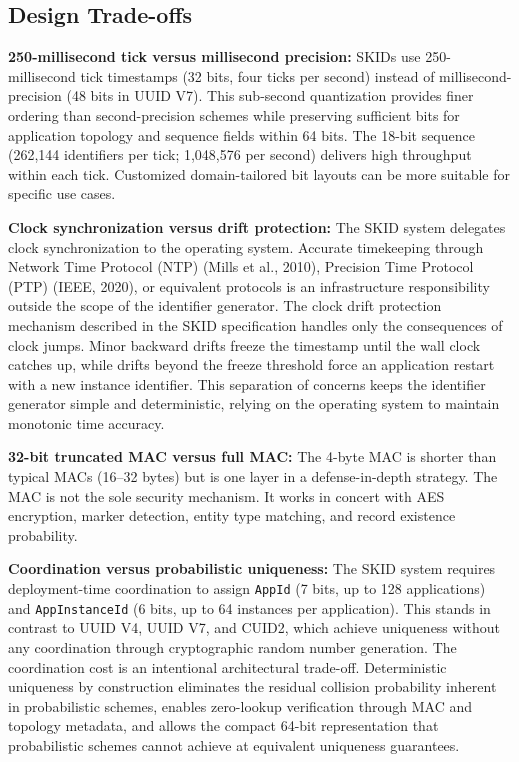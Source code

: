 \documentclass[fleqn,10pt,lineno]{wlpeerj}
\begin{document}
\subsection{Design Trade-offs}\label{design-trade-offs}

\textbf{250-millisecond tick versus millisecond precision:} SKIDs use
250-millisecond tick timestamps (32 bits, four ticks per second) instead
of millisecond-precision (48 bits in UUID V7). This sub-second
quantization provides finer ordering than second-precision schemes while
preserving sufficient bits for application topology and sequence fields
within 64 bits. The 18-bit sequence (262,144 identifiers per tick;
1,048,576 per second) delivers high throughput within each tick.
Customized domain-tailored bit layouts can be more suitable for specific
use cases.

\textbf{Clock synchronization versus drift protection:} The SKID system
delegates clock synchronization to the operating system. Accurate
timekeeping through Network Time Protocol (NTP) (Mills et al., 2010),
Precision Time Protocol (PTP) (IEEE, 2020), or equivalent protocols is
an infrastructure responsibility outside the scope of the identifier
generator. The clock drift protection mechanism described in the SKID
specification handles only the consequences of clock jumps. Minor
backward drifts freeze the timestamp until the wall clock catches up,
while drifts beyond the freeze threshold force an application restart
with a new instance identifier. This separation of concerns keeps the
identifier generator simple and deterministic, relying on the operating
system to maintain monotonic time accuracy.

\textbf{32-bit truncated MAC versus full MAC:} The 4-byte MAC is shorter
than typical MACs (16--32 bytes) but is one layer in a defense-in-depth
strategy. The MAC is not the sole security mechanism. It works in
concert with AES encryption, marker detection, entity type matching, and
record existence probability.

\textbf{Coordination versus probabilistic uniqueness:} The SKID system
requires deployment-time coordination to assign \texttt{AppId} (7 bits,
up to 128 applications) and \texttt{AppInstanceId} (6 bits, up to 64
instances per application). This stands in contrast to UUID V4, UUID V7,
and CUID2, which achieve uniqueness without any coordination through
cryptographic random number generation. The coordination cost is an
intentional architectural trade-off. Deterministic uniqueness by
construction eliminates the residual collision probability inherent in
probabilistic schemes, enables zero-lookup verification through MAC and
topology metadata, and allows the compact 64-bit representation that
probabilistic schemes cannot achieve at equivalent uniqueness
guarantees.
\end{document}
